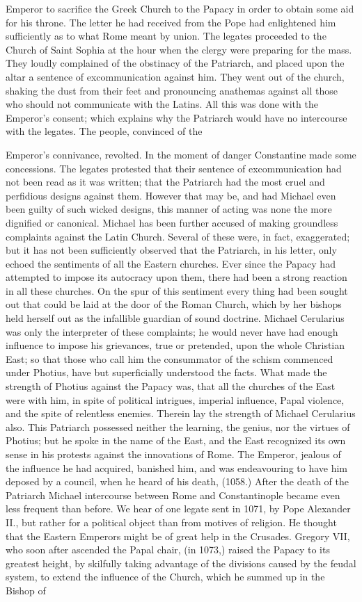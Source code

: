 Emperor to sacrifice the Greek Church to the Papacy in order to obtain some aid for his throne. The letter he had received from the Pope had enlightened him sufficiently as to what Rome meant by union. The legates proceeded to the Church of Saint Sophia at the hour when the clergy were preparing for the mass. They loudly complained of the obstinacy of the Patriarch, and placed upon the altar a sentence of excommunication against him. They went out of the church, shaking the dust from their feet and pronouncing anathemas against all those who should not communicate with the Latins. All this was done with the Emperor's consent; which explains why the Patriarch would have no intercourse with the legates. The people, convinced of the

Emperor's connivance, revolted. In the moment of danger Constantine made some concessions. The legates protested that their sentence of excommunication had not been read as it was written; that the Patriarch had the most cruel and perfidious designs against them. However that may be, and had Michael even been guilty of such wicked designs, this manner of acting was none the more dignified or canonical. Michael has been further accused of making groundless complaints against the Latin Church. Several of these were, in fact, exaggerated; but it has not been sufficiently observed that the Patriarch, in his letter, only echoed the sentiments of all the Eastern churches. Ever since the Papacy had attempted to impose its autocracy upon them, there had been a strong reaction in all these churches. On the spur of this sentiment every thing had been sought out that could be laid at the door of the Roman Church, which by her bishops held herself out as the infallible guardian of sound doctrine. Michael Cerularius was only the interpreter of these complaints; he would never have had enough influence to impose his grievances, true or pretended, upon the whole Christian East; so that those who call him the consummator of the schism commenced under Photius, have but superficially understood the facts. What made the strength of Photius against the Papacy was, that all the churches of the East were with him, in spite of political intrigues, imperial influence, Papal violence, and the spite of relentless enemies. Therein lay the strength of Michael Cerularius also. This Patriarch possessed neither the learning, the genius, nor the virtues of Photius; but he spoke in the name of the East, and the East recognized its own sense in his protests against the innovations of Rome. The Emperor, jealous of the influence he had acquired, banished him, and was endeavouring to have him deposed by a council, when he heard of his death, (1058.) After the death of the Patriarch Michael intercourse between Rome and Constantinople became even less frequent than before. We hear of one legate sent in 1071, by Pope Alexander II., but rather for a political object than from motives of religion. He thought that the Eastern Emperors might be of great help in the Crusades. Gregory VII, who soon after ascended the Papal chair, (in 1073,) raised the Papacy to its greatest height, by skilfully taking advantage of the divisions caused by the feudal system, to extend the influence of the Church, which he summed up in the Bishop of 